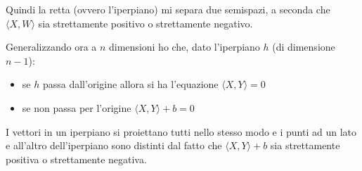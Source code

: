 Quindi la retta (ovvero l'iperpiano) mi separa due semispazi, a seconda che $\langle X,W\rangle$ sia strettamente positivo o strettamente negativo.

Generalizzando ora a $n$ dimensioni ho che, dato l'iperpiano $h$ (di dimensione $n-1$):
\begin{itemize}
    \item se $h$ passa dall'origine allora si ha l'equazione $\langle X,Y\rangle=0$
    \item se non passa per l'origine $\langle X,Y\rangle +b=0$ 
\end{itemize}

I vettori in un iperpiano si proiettano tutti nello stesso modo e i punti ad un lato e all'altro dell'iperpiano sono distinti dal fatto che $\langle X,Y\rangle +b$ sia strettamente positiva o strettamente negativa.